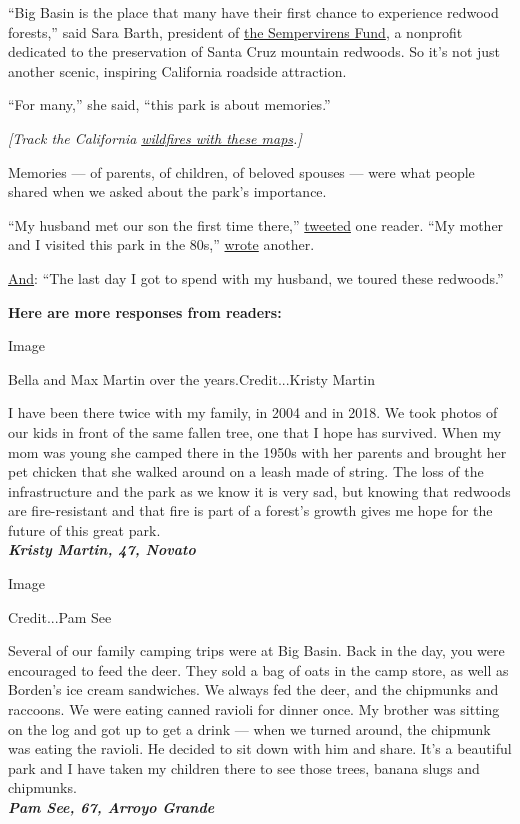``Big Basin is the place that many have their first chance to experience
redwood forests,'' said Sara Barth, president of
\href{https://sempervirens.org/}{the Sempervirens Fund}, a nonprofit
dedicated to the preservation of Santa Cruz mountain redwoods. So it's
not just another scenic, inspiring California roadside attraction.

``For many,'' she said, ``this park is about memories.''

\emph{{[}Track the California}
\href{https://www.nytimes3xbfgragh.onion/interactive/2020/08/20/us/california-wildfire-maps.html?}{\emph{wildfires
with these maps}}\emph{.{]}}

Memories --- of parents, of children, of beloved spouses --- were what
people shared when we asked about the park's importance.

``My husband met our son the first time there,''
\href{https://twitter.com/1abby4ever/status/1297639210698956800}{tweeted}
one reader. ``My mother and I visited this park in the 80s,''
\href{https://twitter.com/mabbot2/status/1297630717778653184}{wrote}
another.

\href{https://twitter.com/1KarieMoody/status/1297450724289155072}{And}:
``The last day I got to spend with my husband, we toured these
redwoods.''

\textbf{Here are more responses from readers:}

Image

Bella and Max Martin over the years.Credit...Kristy Martin

I have been there twice with my family, in 2004 and in 2018. We took
photos of our kids in front of the same fallen tree, one that I hope has
survived. When my mom was young she camped there in the 1950s with her
parents and brought her pet chicken that she walked around on a leash
made of string. The loss of the infrastructure and the park as we know
it is very sad, but knowing that redwoods are fire-resistant and that
fire is part of a forest's growth gives me hope for the future of this
great park.\\
\emph{\textbf{Kristy Martin, 47, Novato}}

Image

Credit...Pam See

Several of our family camping trips were at Big Basin. Back in the day,
you were encouraged to feed the deer. They sold a bag of oats in the
camp store, as well as Borden's ice cream sandwiches. We always fed the
deer, and the chipmunks and raccoons. We were eating canned ravioli for
dinner once. My brother was sitting on the log and got up to get a drink
--- when we turned around, the chipmunk was eating the ravioli. He
decided to sit down with him and share. It's a beautiful park and I have
taken my children there to see those trees, banana slugs and
chipmunks.\\
\emph{\textbf{Pam See, 67, Arroyo Grande}}

